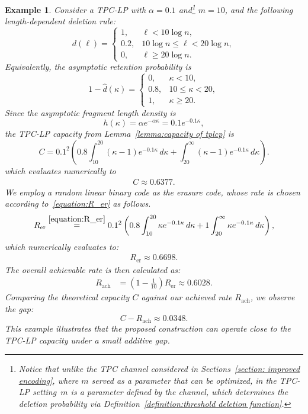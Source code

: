 \documentclass[journal,letterpaper,onecolumn,11pt]{IEEEtran}
\newtheorem{example}{Example}
\begin{document}
\begin{example}
    Consider a TPC-LP with \(\alpha=0.1\) and\footnote{
    Notice that unlike the TPC channel considered in Sections~\ref{section: improved encoding},
    where \(m\) served as a parameter that can be optimized, in the TPC-LP setting~$m$ is a parameter defined by the channel, which determines the deletion
    probability via Definition~\ref{definition:threshold deletion function}.} $m=10$, and the following
    length-dependent deletion rule:
    \[
    d(\ell)=
    \begin{cases}
    1, & \ell<10\log n,\\
    0.2, & 10\log n\le \ell<20\log n,\\
    0, & \ell\ge 20\log n.
    \end{cases}
    \]
    Equivalently, the asymptotic retention probability is
    \[
    1-\hat d(\kappa)=
    \begin{cases}
    0, & \kappa<10,\\
    0.8, & 10\le \kappa<20,\\
    1, & \kappa\ge 20.
    \end{cases}
    \]
    Since the asymptotic fragment length density is
    \[
    h(\kappa)=\alpha e^{-\alpha\kappa}=0.1e^{-0.1\kappa},
    \]
    the TPC-LP capacity from Lemma~\ref{lemma:capacity of tplcp} is
    \[
    C
    =
    0.1^2 \left(
    0.8 \int_{10}^{20}(\kappa-1)e^{-0.1\kappa}\,d\kappa
    +
    \int_{20}^{\infty}(\kappa-1)e^{-0.1\kappa}\,d\kappa
    \right).
    \]
    which evaluates numerically to
    \begin{align*}
    C\approx 0.6377.
    \end{align*}
    We employ a random linear binary code as the erasure code, whose rate is chosen according to~\eqref{equation:R_er} as follows.     
\[
R_{\mathrm{er}}
\overset{\eqref{equation:R_er}}{=}
0.1^2 \left(
0.8 \int_{10}^{20} \kappa e^{-0.1\kappa}\,d\kappa
+
1 \int_{20}^\infty \kappa e^{-0.1\kappa}\,d\kappa
\right),
\]
which numerically evaluates to:
\begin{align*}
R_{\mathrm{er}} \approx 0.6698.
\end{align*}
The overall achievable rate is then calculated as:
\begin{align*}
R_{\mathrm{ach}}
&=
\left(1-\frac{1}{10}\right)R_{\mathrm{er}} \approx 0.6028.
\end{align*}
 Comparing the theoretical capacity $C$ against our achieved rate $R_{\mathrm{ach}}$, we observe the gap:
\[
C - R_{\mathrm{ach}} \approx 0.0348.
\]
This example illustrates that the proposed construction can operate
    close to the TPC-LP capacity under a small additive gap.
\end{example}
\printbibliography
\appendices
\end{document}
